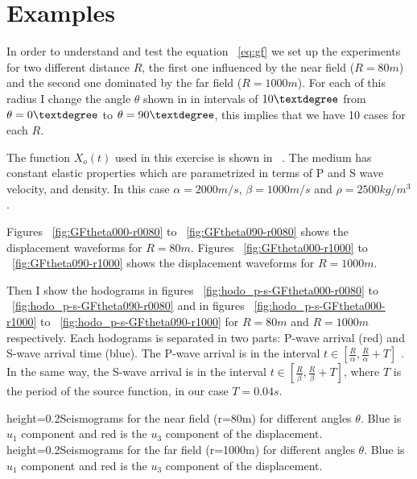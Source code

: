 \section{Examples}


In order to understand and test the equation ~\ref{eq:gf} we set up  the experiments for two different distance $R$, the 
first one influenced by the near field ($R=80m$) and the second one dominated by the far field ($R=1000m$). For each of this
radius I change the angle $\theta$ shown in  in intervals of $10\textdegree$ from $\theta=0\textdegree$ to 
$\theta=90\textdegree$, this implies that we have 10 cases for each $R$.

The function $X_o(t)$ used in this exercise is shown in ~. The medium has constant elastic properties which
are parametrized in terms of P and S wave velocity, and density. In this case $\alpha=2000m/s$, $\beta=1000m/s$ 
and $\rho=2500kg/m^3$.


Figures ~\ref{fig:GFtheta000-r0080} to ~\ref{fig:GFtheta090-r0080} shows the displacement waveforms for $R=80m$.
Figures ~\ref{fig:GFtheta000-r1000} to ~\ref{fig:GFtheta090-r1000} shows the displacement waveforms for $R=1000m$.

Then I show the hodograms in figures ~\ref{fig:hodo_p-s-GFtheta000-r0080} to ~\ref{fig:hodo_p-s-GFtheta090-r0080} and in figures
~\ref{fig:hodo_p-s-GFtheta000-r1000} to ~\ref{fig:hodo_p-s-GFtheta090-r1000}  for $R=80m$ and $R=1000m$ respectively. Each hodograms
is separated in two parts: P-wave arrival (red) and S-wave arrival time (blue). The P-wave arrival is in the interval $t \in [\frac{R}{\alpha},\frac{R}{\alpha}+T]$
. In the same way, the S-wave arrival is in the interval $t \in [\frac{R}{\beta},\frac{R}{\beta}+T]$, where $T$ is the period of the 
source function, in our case $T=0.04s$.





%
{height=0.2\textheight}{Seismograms for the near field (r=80m) for different angles $\theta$. Blue is $u_1$ component and red is the $u_3$ component of the displacement.}
%
{height=0.2\textheight}{Seismograms for the far field (r=1000m) for different angles $\theta$. Blue is $u_1$ component and red is the $u_3$ component of the displacement.}


